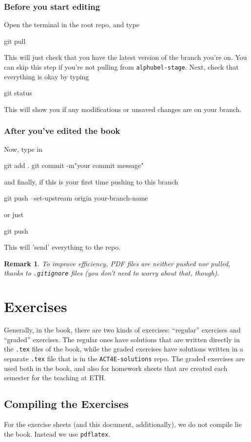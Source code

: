\documentclass{article}
\newtheorem{remark}{Remark}
\begin{document}
\subsubsection{Before you start editing}
Open the terminal in the root repo, and type 
\begin{bashcode}
    git pull 
\end{bashcode}
This will just check that you have the latest version of the branch you're on. You can skip this step if you're not pulling from \texttt{alphubel-stage}. Next, check that everything is okay by typing
\begin{bashcode}
    git status
\end{bashcode} 
This will show you if any modifications or unsaved changes are on your branch.
\subsubsection{After you've edited the book}
Now, type in
\begin{bashcode}
    git add .
    git commit -m"your commit message"
\end{bashcode}
and finally, if this is your first time pushing to this branch
\begin{bashcode}
    git push --set-upstream origin your-branch-name
\end{bashcode}
or just 
\begin{bashcode}
    git push
\end{bashcode}
This will 'send' everything to the repo.
\begin{remark}
    To improve efficiency, PDF files are neither pushed nor pulled, thanks to \texttt{.gitignore} files (you don't need to worry about that, though).
\end{remark}

\section{Exercises}
Generally, in the book, there are two kinds of exercises: “regular” exercises and “graded” exercises. The regular ones have solutions that are written directly in the \texttt{.tex} files of the book, while the graded exercises have solutions written in a separate \texttt{.tex} file that is in the \texttt{ACT4E-solutions} repo. The graded exercises are used both in the book, and also for homework sheets that are created each semester for the teaching at ETH.

\subsection{Compiling the Exercises}
For the exercise sheets (and this document, additionally), we do not compile lie the book. Instead we use \texttt{pdflatex}. 
\end{document}
